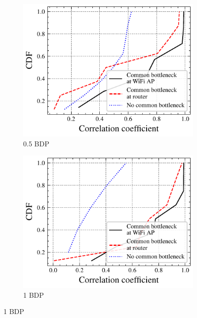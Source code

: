 \begin{figure}
  \centering
  \begin{subfigure}{0.49\textwidth}
    \centering
    \includegraphics[width=\textwidth]{figures/bdp/bdp-05-no-video.pdf}
    \caption{\label{subfig:bdp-10}0.5 BDP}
  \end{subfigure}%
  \hfill
  \begin{subfigure}{0.49\textwidth}
    \centering
    \includegraphics[width=\textwidth]{figures/bdp/bdp-10-no-video.pdf}
    \caption{\label{subfig:bdp-10}1 BDP}
  \end{subfigure}%
  \vspace{1ex}

\end{figure}
